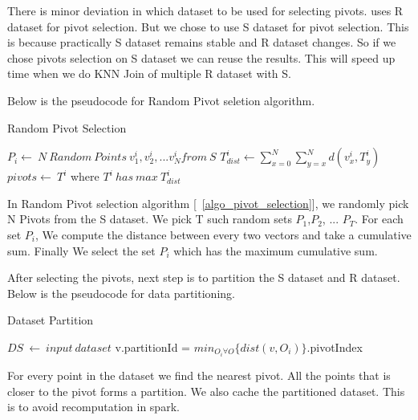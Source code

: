 There is minor deviation in which dataset to be used for selecting
pivots. \cite{lu_efficient_2012} uses R dataset for pivot
selection. But we chose to use S dataset for pivot selection. This is
because practically S dataset remains stable and R dataset changes. So
if we chose pivots selection on S dataset we can reuse the
results. This will speed up time when we do KNN Join of multiple R
dataset with S.

\medskip

Below is the pseudocode for Random Pivot seletion algorithm.

\begin{algorithm}
  \caption{Random Pivot Selection}
  \label{algo_pivot_selection}
  \begin{algorithmic}[1]
    \STATE $P_i  \leftarrow \ N\ Random\ Points\ v^i_1,v^i_2,...v^i_N  from\ S$
    \STATE $T_{dist}^i \leftarrow \sum\limits_{x=0}^N\sum\limits_{y=x}^N d(v^i_x, T^i_y)$
    \ENDFOR
    \STATE $pivots \leftarrow\ T^i$ where $T^i\ has\ max\ T^i_{dist}$
  \end{algorithmic}
\end{algorithm}


In Random Pivot selection algorithm [~\ref{algo_pivot_selection}], we randomly pick N Pivots from the
S dataset. We pick T such random sets {$P_1$,$P_2$, ... $P_T$}. For each set $P_i$, We
compute the distance between every two
vectors and take a cumulative sum. Finally We select the set $P_i$
which has the maximum cumulative sum.

\bigskip

After selecting the pivots, next step is to partition the S dataset
and R dataset. Below is the pseudocode for data partitioning.

\begin{algorithm}
  \caption{Dataset Partition}
  \label{algo_dataset_partition}
  \begin{algorithmic}[1]
    \STATE $DS\ \leftarrow\ input\ dataset$
    \STATE v.partitionId = $min_{O_i \forall O}\{dist(v, O_i)\}$.pivotIndex
    \ENDFOR
  \end{algorithmic}
\end{algorithm}


For every point in the dataset we find the nearest pivot. All
the points that is closer to the pivot forms a partition. We also
cache the partitioned dataset. This is to avoid recomputation in
spark.

